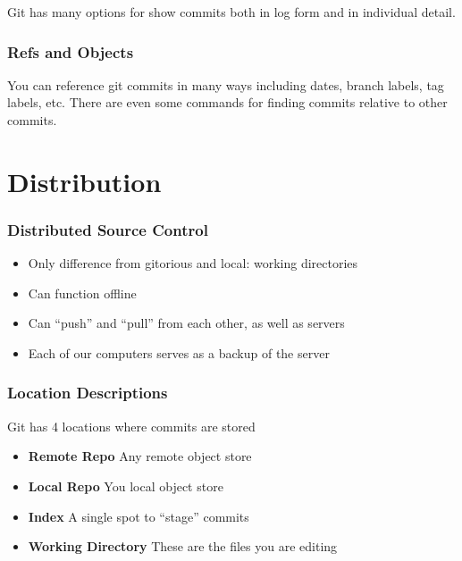 Git has many options for show commits both in log form and in individual detail.

\begin{frame}
  \frametitle{Refs and Objects}
    \pause
    \pause
    \pause
\end{frame}

You can reference git commits in many ways including dates, branch labels, tag
labels, etc. There are even some commands for finding commits relative to other
commits.

\section{Distribution}

\begin{frame}
  \frametitle{Distributed Source Control}
  \begin{itemize}
  \item Only difference from gitorious and local: working directories
    \pause
  \item Can function offline
    \pause
  \item Can ``push'' and ``pull'' from each other, as well as servers
    \pause
  \item Each of our computers serves as a backup of the server
  \end{itemize}
\end{frame}

\begin{frame}
  \frametitle{Location Descriptions}
  Git has 4 locations where commits are stored
  \pause
  \begin{itemize}
  \item \textbf{Remote Repo} Any remote object store
    \pause
  \item \textbf{Local Repo} You local object store
    \pause
  \item \textbf{Index} A single spot to ``stage'' commits
    \pause
  \item \textbf{Working Directory} These are the files you are editing
  \end{itemize}
\end{frame}

